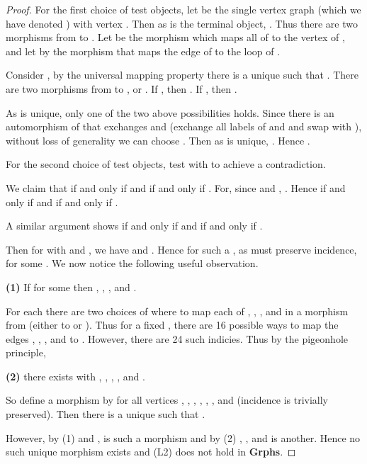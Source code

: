 \documentclass[11pt]{article}
\begin{document}
\begin{proof}
For the first choice of test objects, let  be the single vertex graph  (which we have denoted ) with vertex . Then as  is the terminal object, . Thus there are two morphisms from  to . Let  be the morphism which maps all of  to the vertex  of , and let  by the morphism that maps the edge of  to the loop  of .\par
Consider , by the universal mapping property there is a unique  such that . There are two morphisms from  to ,  or . If , then . If , then .\par
As  is unique, only one of the two above possibilities holds. Since there is an automorphism of  that exchanges  and  (exchange all labels of  and  and swap  with ), without loss of generality we can choose . Then as  is unique, . Hence .\par
For the second choice of test objects, test with  to achieve a contradiction.\par
We claim that  if and only if  and  if and only if . For, since  and , . Hence  if and only if  and  if and only if .\par
A similar argument shows  if and only if  and  if and only if .\par
Then for  with  and , we have  and . Hence for such a , as  must preserve incidence,  for some . We now notice the following useful observation.\par
\textbf{(1)} If  for some  then , , , and .\par
For each  there are two choices of where to map each of , , , and  in a morphism from  (either to  or ). Thus for a fixed , there are 16 possible ways to map the edges , , , and  to . However, there are 24 such indicies. Thus by the pigeonhole principle,\par
\textbf{(2)} there exists  with , , , , and .\par
So define a morphism  by  for all vertices , , , , , , and  (incidence is trivially preserved). Then there is a unique  such that .\par
However, by (1)  and ,  is such a morphism and by (2) , , and  is another. Hence no such unique morphism exists and (L2) does not hold in \textbf{Grphs}.\par


\end{proof}
\end{document}

